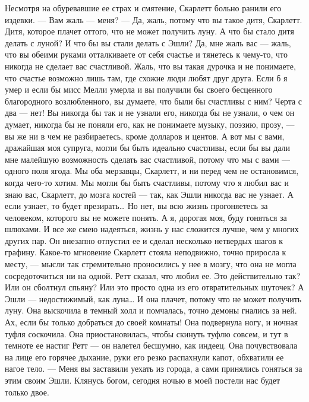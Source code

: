 Несмотря на обуревавшие ее страх и смятение, Скарлетт больно ранили его издевки.
— Вам жаль — меня?
— Да, жаль, потому что вы такое дитя, Скарлетт. Дитя, которое плачет оттого, что не может получить луну. А что бы стало дитя делать с луной? И что бы вы стали делать с Эшли? Да, мне жаль вас — жаль, что вы обеими руками отталкиваете от себя счастье и тянетесь к чему-то, что никогда не сделает вас счастливой. Жаль, что вы такая дурочка и не понимаете, что счастье возможно лишь там, где схожие люди любят друг друга. Если б я умер и если бы мисс Мелли умерла и вы получили бы своего бесценного благородного возлюбленного, вы думаете, что были бы счастливы с ним? Черта с два — нет! Вы никогда бы так и не узнали его, никогда бы не узнали, о чем он думает, никогда бы не поняли его, как не понимаете музыку, поэзию, прозу, — вы же ни в чем не разбираетесь, кроме долларов и центов. А вот мы с вами, дражайшая моя супруга, могли бы быть идеально счастливы, если бы вы дали мне малейшую возможность сделать вас счастливой, потому что мы с вами — одного поля ягода. Мы оба мерзавцы, Скарлетт, и ни перед чем не остановимся, когда чего-то хотим. Мы могли бы быть счастливы, потому что я любил вас и знаю вас, Скарлетт, до мозга костей — так, как Эшли никогда вас не узнает. А если узнает, то будет презирать… Но нет, вы всю жизнь прогоняетесь за человеком, которого вы не можете понять. А я, дорогая моя, буду гоняться за шлюхами. И все же смею надеяться, жизнь у нас сложится лучше, чем у многих других пар.
Он внезапно отпустил ее и сделал несколько нетвердых шагов к графину. Какое-то мгновение Скарлетт стояла неподвижно, точно приросла к месту, — мысли так стремительно проносились у нее в мозгу, что она не могла сосредоточиться ни на одной. Ретт сказал, что любил ее. Это действительно так? Или он сболтнул спьяну? Или это просто одна из его отвратительных шуточек? А Эшли — недостижимый, как луна… И она плачет, потому что не может получить луну. Она выскочила в темный холл и помчалась, точно демоны гнались за ней. Ах, если бы только добраться до своей комнаты! Она подвернула ногу, и ночная туфля соскочила. Она приостановилась, чтобы скинуть туфлю совсем, и тут в темноте ее настиг Ретт — он налетел бесшумно, как индеец. Она почувствовала на лице его горячее дыхание, руки его резко распахнули капот, обхватили ее нагое тело.
— Меня вы заставили уехать из города, а сами принялись гоняться за этим своим Эшли. Клянусь богом, сегодня ночью в моей постели нас будет только двое.
